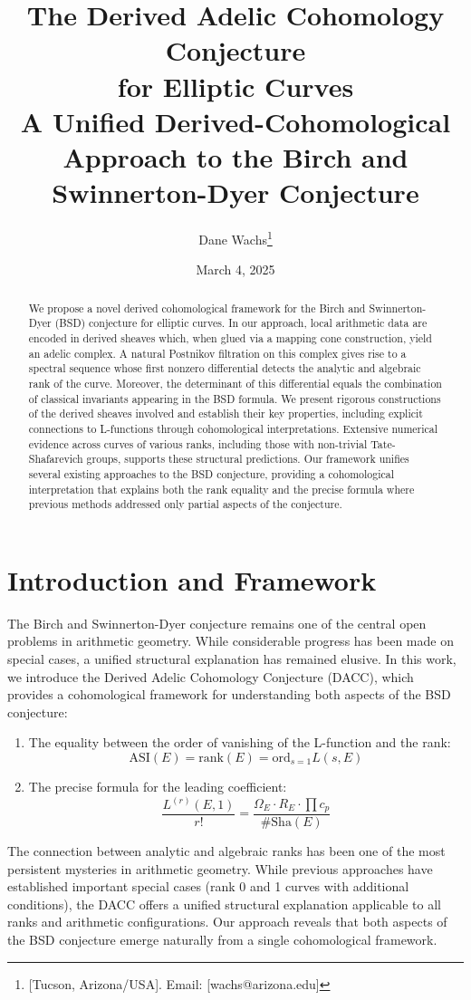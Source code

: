 \documentclass{article}
\title{The Derived Adelic Cohomology Conjecture \\
for Elliptic Curves\\[3mm]
\small A Unified Derived-Cohomological Approach to the Birch and Swinnerton-Dyer Conjecture}
\author{Dane Wachs\thanks{[Tucson, Arizona/USA]. Email: [wachs@arizona.edu]}}
\date{March 4, 2025}
\theoremstyle{plain}
\theoremstyle{definition}
\theoremstyle{remark}
\begin{document}
\maketitle

\begin{abstract}
We propose a novel derived cohomological framework for the Birch and Swinnerton-Dyer (BSD) conjecture for elliptic curves. In our approach, local arithmetic data are encoded in derived sheaves which, when glued via a mapping cone construction, yield an adelic complex. A natural Postnikov filtration on this complex gives rise to a spectral sequence whose first nonzero differential detects the analytic and algebraic rank of the curve. Moreover, the determinant of this differential equals the combination of classical invariants appearing in the BSD formula. We present rigorous constructions of the derived sheaves involved and establish their key properties, including explicit connections to L-functions through cohomological interpretations. Extensive numerical evidence across curves of various ranks, including those with non-trivial Tate-Shafarevich groups, supports these structural predictions. Our framework unifies several existing approaches to the BSD conjecture, providing a cohomological interpretation that explains both the rank equality and the precise formula where previous methods addressed only partial aspects of the conjecture.
\end{abstract}

\section{Introduction and Framework}

The Birch and Swinnerton-Dyer conjecture remains one of the central open problems in arithmetic geometry. While considerable progress has been made on special cases, a unified structural explanation has remained elusive. In this work, we introduce the Derived Adelic Cohomology Conjecture (DACC), which provides a cohomological framework for understanding both aspects of the BSD conjecture:

\begin{enumerate}
\item The equality between the order of vanishing of the L-function and the rank:
\[
\text{ASI}(E) = \text{rank}(E) = \text{ord}_{s=1}L(s, E)
\]

\item The precise formula for the leading coefficient:
\[
\frac{L^{(r)}(E, 1)}{r!} = \frac{\Omega_E \cdot R_E \cdot \prod c_p}{\#\text{Sha}(E)}
\]
\end{enumerate}
\newpage
The connection between analytic and algebraic ranks has been one of the most persistent mysteries in arithmetic geometry. While previous approaches have established important special cases (rank 0 and 1 curves with additional conditions), the DACC offers a unified structural explanation applicable to all ranks and arithmetic configurations. Our approach reveals that both aspects of the BSD conjecture emerge naturally from a single cohomological framework.
\end{document}
